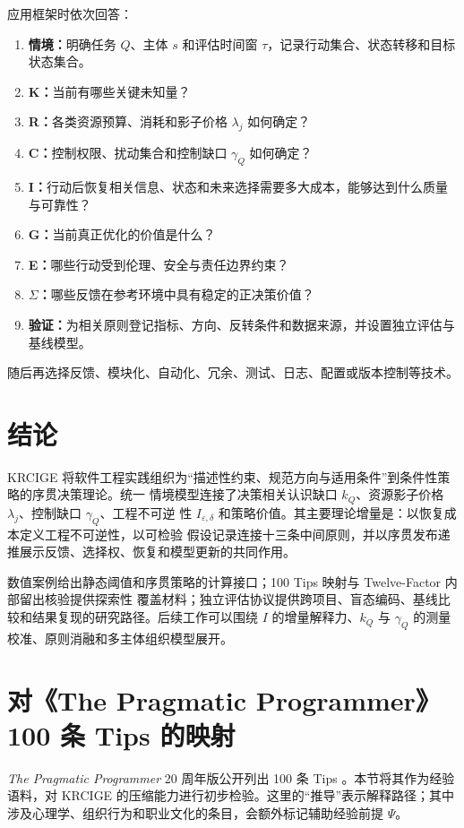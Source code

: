 \documentclass[11pt,a4paper]{ctexart}
\numberwithin{equation}{section}
\theoremstyle{definition}
\theoremstyle{plain}
\newcommand{\PP}{\textit{The Pragmatic Programmer}}
\begin{document}
应用框架时依次回答：
\begin{enumerate}
    \item \textbf{情境：}明确任务 $Q$、主体 $s$ 和评估时间窗 $\tau$，记录行动集合、状态转移和目标状态集合。
    \item \textbf{K：}当前有哪些关键未知量？
    \item \textbf{R：}各类资源预算、消耗和影子价格 $\lambda_j$ 如何确定？
    \item \textbf{C：}控制权限、扰动集合和控制缺口 $\gamma_Q$ 如何确定？
    \item \textbf{I：}行动后恢复相关信息、状态和未来选择需要多大成本，能够达到什么质量与可靠性？
    \item \textbf{G：}当前真正优化的价值是什么？
    \item \textbf{E：}哪些行动受到伦理、安全与责任边界约束？
    \item \textbf{$\Sigma$：}哪些反馈在参考环境中具有稳定的正决策价值？
    \item \textbf{验证：}为相关原则登记指标、方向、反转条件和数据来源，并设置独立评估与基线模型。
\end{enumerate}

随后再选择反馈、模块化、自动化、冗余、测试、日志、配置或版本控制等技术。

\section{结论}

KRCIGE 将软件工程实践组织为“描述性约束、规范方向与适用条件”到条件性策略的序贯决策理论。统一
情境模型连接了决策相关认识缺口 $k_Q$、资源影子价格 $\lambda_j$、控制缺口 $\gamma_Q$、工程不可逆
性 $I_{\varepsilon,\delta}$ 和策略价值。其主要理论增量是：以恢复成本定义工程不可逆性，以可检验
假设记录连接十三条中间原则，并以序贯发布递推展示反馈、选择权、恢复和模型更新的共同作用。

数值案例给出静态阈值和序贯策略的计算接口；100 Tips 映射与 Twelve-Factor 内部留出核验提供探索性
覆盖材料；独立评估协议提供跨项目、盲态编码、基线比较和结果复现的研究路径。后续工作可以围绕
$I$ 的增量解释力、$k_Q$ 与 $\gamma_Q$ 的测量校准、原则消融和多主体组织模型展开。

\appendix

\section{对《The Pragmatic Programmer》100 条 Tips 的映射}

\PP{} 20 周年版公开列出 100 条 Tips \cite{pragmatic2019,pragmatic2019tips}。本节将其作为经验语料，对 KRCIGE 的压缩能力进行初步检验。这里的“推导”表示解释路径；其中涉及心理学、组织行为和职业文化的条目，会额外标记辅助经验前提 $\Psi$。
\end{document}
